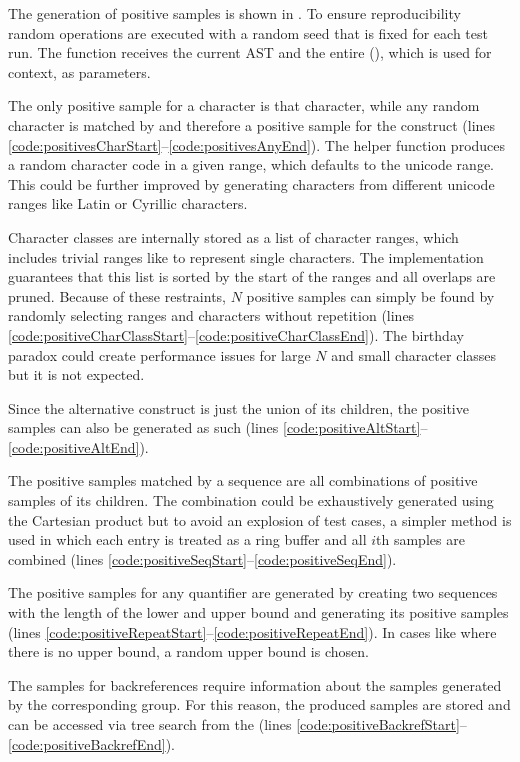 The generation of positive samples is shown in . To ensure reproducibility random operations are executed with a random seed that is fixed for each test run. The function receives the current AST  and the entire  (), which is used for context, as parameters.

The only positive sample for a character is that character, while any random character is matched by and therefore a positive sample for the  construct (lines \ref{code:positivesCharStart}--\ref{code:positivesAnyEnd}). The helper function  produces a random character code in a given range, which defaults to the unicode range. This could be further improved by generating characters from different unicode ranges like Latin or Cyrillic characters.

Character classes are internally stored as a list of character ranges, which includes trivial ranges like \pattern{[a-a]} to represent single characters. The implementation guarantees that this list is sorted by the start of the ranges and all overlaps are pruned. Because of these restraints, $N$ positive samples can simply be found by randomly selecting ranges and characters without repetition (lines \ref{code:positiveCharClassStart}--\ref{code:positiveCharClassEnd}). The birthday paradox could create performance issues for large $N$ and small character classes but it is not expected.

Since the alternative construct is just the union of its children, the positive samples can also be generated as such (lines \ref{code:positiveAltStart}--\ref{code:positiveAltEnd}).

The positive samples matched by a sequence are all combinations of positive samples of its children. The combination could be exhaustively generated using the Cartesian product but to avoid an explosion of test cases, a simpler method is used in which each entry is treated as a ring buffer and all $i$th samples are combined (lines \ref{code:positiveSeqStart}--\ref{code:positiveSeqEnd}).

The positive samples for any quantifier are generated by creating two sequences with the length of the lower and upper bound and generating its positive samples (lines \ref{code:positiveRepeatStart}--\ref{code:positiveRepeatEnd}). In cases like  where there is no upper bound, a random upper bound is chosen.

The samples for backreferences require information about the samples generated by the corresponding group. For this reason, the produced samples are stored and can be accessed via tree search from the  (lines \ref{code:positiveBackrefStart}--\ref{code:positiveBackrefEnd}).

